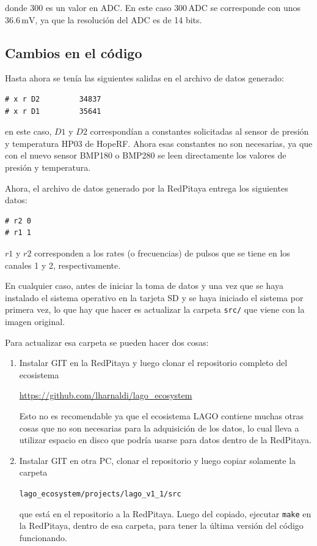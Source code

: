 \documentclass[a4paper,11pt]{article}
\begin{document}
\noindent donde 300 es un valor en ADC. En este caso $300\,\text{ADC}$ se
corresponde con unos $36.6\,\text{mV}$, ya que la resolución del ADC es de 14
bits.

\subsection{Cambios en el código}
Hasta ahora se tenía las siguientes salidas en el archivo de datos generado:

\begin{verbatim}
# x r D2         34837
# x r D1         35641
\end{verbatim}

\noindent en este caso, $D1$ y $D2$ correspondían a constantes solicitadas al
sensor de presión y temperatura HP03 de HopeRF. Ahora esas constantes no son
necesarias, ya que con el nuevo sensor BMP180 o BMP280 se leen directamente los
valores de presión y temperatura.

Ahora, el archivo de datos generado por la RedPitaya entrega los siguientes
datos:

\begin{verbatim}
# r2 0
# r1 1
\end{verbatim}

\noindent $r1$ y $r2$ corresponden a los rates (o frecuencias) de pulsos que se
tiene en los canales 1 y 2, respectivamente.

En cualquier caso, antes de iniciar la toma de datos y una vez que se haya
instalado el sistema operativo en la tarjeta SD y se haya iniciado el sistema
por primera vez, lo que hay que hacer es actualizar la carpeta \texttt{src/} que
viene con la imagen original. 

Para actualizar esa carpeta se pueden hacer dos cosas:
\begin{enumerate}
				\item Instalar GIT en la RedPitaya y luego clonar el repositorio
								completo del ecosistema

								\href{https://github.com/lharnaldi/lago\_ecosystem}{https://github.com/lharnaldi/lago\_ecosystem} 

								Esto no es recomendable ya que el ecosistema LAGO contiene
								muchas otras cosas que no son necesarias para la adquisición de
								los datos, lo cual lleva a utilizar espacio en disco que podría
								usarse para datos dentro de la RedPitaya.
				\item Instalar GIT en otra PC, clonar el repositorio y luego copiar
								solamente la carpeta 

								\texttt{lago\_ecosystem/projects/lago\_v1\_1/src} 
								
								que está en el
								repositorio a la RedPitaya. Luego del copiado, ejecutar
								\texttt{make} en la RedPitaya, dentro de esa carpeta, para tener
								la última versión del código funcionando.
\end{enumerate}
\end{document}
